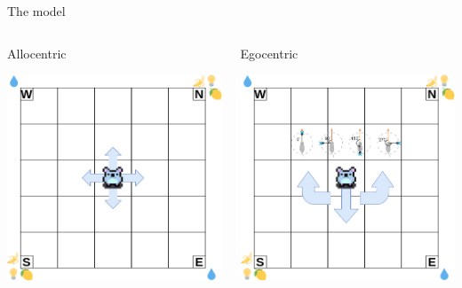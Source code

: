 \documentclass[bigger]{beamer}
\begin{document}
\begin{frame}[label={sec:org1827034}]{The model}
\addtocounter{framenumber}{-1}
\begin{columns}
\begin{column}{0.5\columnwidth}
\center
Allocentric
\begin{center}
\includegraphics[width=\textwidth]{img/RL_env-allo-model.drawio.png}
\end{center}
\end{column}
\begin{column}{0.5\columnwidth}
\center
Egocentric
\begin{center}
\includegraphics[width=\textwidth]{img/RL_env-ego-model.drawio.png}
\end{center}
\end{column}
\end{columns}
\end{frame}
\end{document}
